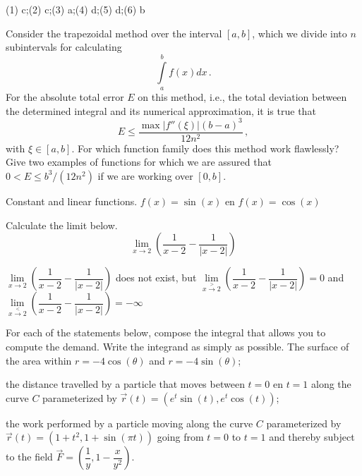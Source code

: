 \begin{Answer}
(1) c;\quad (2) c;\quad (3) a;\quad (4) d;\quad (5) d;\quad (6) b    
\end{Answer}


\begin{Exercise}  Consider the trapezoidal method over the interval $[a,b]$, which we divide into $n$ subintervals for calculating 
$$
\int\limits_a^bf(x)dx\,.
$$
For the absolute total error $E$ on this method, i.e., the total deviation between the determined integral and its numerical approximation, it is true that
$$
E\leq\dfrac{\max|f''(\xi)|(b-a)^3}{12n^2}\,,
$$
with $\xi\in[a,b]$.
\Question For which function family does this method work flawlessly?
\Question Give two examples of functions for which we are assured that $0<E\leq b^3/(12n^2)$ if we are working over $[0,b]$.
\end{Exercise}

\begin{Answer}
\Question Constant and linear functions.
\Question $f(x)=\sin(x)$ en $f(x)=\cos(x)$
\end{Answer}


\begin{Exercise}  Calculate the limit below.
\[ \lim\limits_{x \to 2} \left( \dfrac{1}{x-2} - \dfrac{1}{|x-2|} \right) \]
\end{Exercise}

\begin{Answer}
 $\lim\limits_{x \to 2} \left( \dfrac{1}{x-2} - \dfrac{1}{|x-2|} \right)$ does not exist, but $\lim\limits_{x \stackrel{>}{\to} 2} \left( \dfrac{1}{x-2} - \dfrac{1}{|x-2|} \right)=0$ and  $\lim\limits_{x \stackrel{<} {\to}2} \left( \dfrac{1}{x-2} - \dfrac{1}{|x-2|} \right)=-\infty$
\end{Answer}

\begin{Exercise} For each of the statements below, compose the integral that allows you to compute the demand. Write the integrand as simply as possible.
\Question The surface of the area within $r=-4\cos(\theta)$ and $r=-4\sin(\theta)$; %

\Question the distance travelled by a particle that moves between $t=0$ en $t=1$ along the curve $C$ parameterized by $\vec{r}(t)=\left(e^t\sin(t),e^t\cos(t)\right)$;

\Question the work performed by a particle moving along the curve $C$ parameterized by $\vec{r}(t)=\left(1+t^2,1+\sin(\pi t)\right)$ going from $t =0$ to $t=1$ and thereby subject to the field $\vec{F}=\left(\dfrac{1}{y},1- \dfrac{x}{y^2}\right)$.
\end{Exercise}

